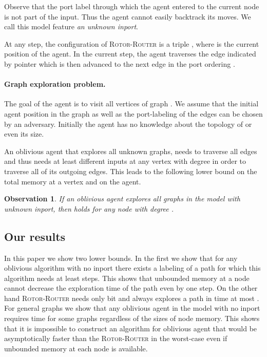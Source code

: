 \documentclass{article}[11pt,letter]
\newtheorem{observation}[definition]{Observation}
\newtheorem{observation}[definition]{Observation}
\newcommand{\RR}{{\textsc{Rotor-Router}}\xspace}
\begin{document}
Observe that the port label through which the agent entered to the current node is not part of the input. Thus the agent cannot easily backtrack its moves. We call this model feature \textit{an unknown inport}. 

At any step, the configuration of \RR is a triple , where  is the current position of the agent. In the current step, the agent traverses the edge indicated by pointer  which is then advanced to the next edge in the port ordering .

\paragraph{Graph exploration problem.}
The goal of the agent is to visit all vertices of graph . We assume that the initial agent position in the graph as well as the port-labeling of the edges can be chosen by an adversary. Initially the agent has no knowledge about the topology of  or even its size. 



An oblivious agent that explores all unknown graphs, needs to traverse all edges and thus needs at least  different inputs at any vertex with degree  in order to traverse all of its outgoing edges. This leads to the following lower bound on the total memory at a vertex and on the agent.

\begin{observation}
\label{trivial_lower_bound}
If an oblivious agent explores all graphs in the model with unknown inport, then  holds for any node with degree .
\end{observation}







\subsection{Our results}
In this paper we show two lower bounds. In the first we show that for any oblivious algorithm with no inport there exists a labeling of a path for which this algorithm needs at least  steps. This shows that unbounded memory at a node cannot decrease the exploration time of the path even by one step. On the other hand \RR needs only  bit and always explores a path in time at most .
For general graphs we show that any oblivious agent in the model with no inport requires time  for some graphs regardless of the sizes of node memory. This shows that it is impossible to construct an algorithm for oblivious agent that would be asymptotically faster than the \RR in the worst-case even if unbounded memory at each node is available.
\end{document}
